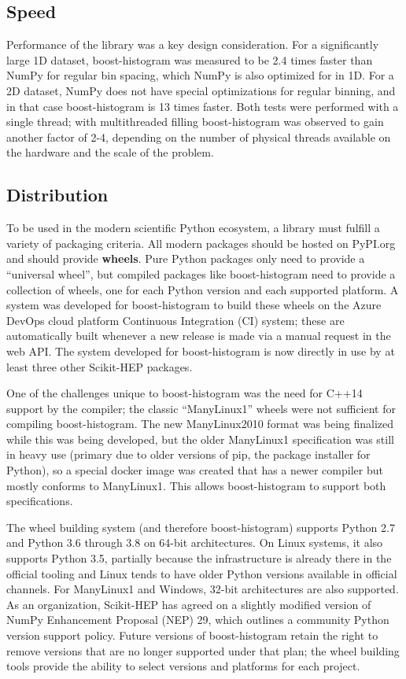 \documentclass{webofc}
\begin{document}
\subsection{Speed}

Performance of the library was a key design consideration. For a significantly large 1D dataset, boost-histogram was measured to be 2.4 times faster than NumPy for regular bin spacing, which NumPy is also optimized for in 1D. For a 2D dataset, NumPy does not have special optimizations for regular binning, and in that case boost-histogram is 13 times faster. Both tests were performed with a single thread; with multithreaded filling boost-histogram was observed to gain another factor of 2-4, depending on the number of physical threads available on the hardware and the scale of the problem.

\subsection{Distribution}

To be used in the modern scientific Python ecosystem, a library must fulfill a variety of packaging criteria. All modern packages should be hosted on PyPI.org and should provide \textbf{wheels}. Pure Python packages only need to provide a ``universal wheel'', but compiled packages like boost-histogram need to provide a collection of wheels, one for each Python version and each supported platform. A system was developed for boost-histogram to build these wheels on the Azure DevOps cloud platform Continuous Integration (CI) system; these are automatically built whenever a new release is made via a manual request in the web API. The system developed for boost-histogram is now directly in use by at least three other Scikit-HEP packages.

One of the challenges unique to boost-histogram was the need for C++14 support by the compiler; the classic ``ManyLinux1'' wheels were not sufficient for compiling boost-histogram. The new ManyLinux2010 format was being finalized while this was being developed, but the older ManyLinux1 specification was still in heavy use 
(primary due to older versions of pip, the package installer for Python), so a special docker image was created that has a newer compiler but mostly conforms to ManyLinux1. This allows boost-histogram to support both specifications.

The wheel building system (and therefore boost-histogram) supports Python 2.7 and Python 3.6 through 3.8 on 64-bit architectures. On Linux systems, it also supports Python 3.5, partially because the infrastructure is already there in the official tooling and Linux tends to have older Python versions available in official channels. For ManyLinux1 and Windows, 32-bit architectures are also supported. As an organization, Scikit-HEP has agreed on a slightly modified version of NumPy Enhancement Proposal (NEP) 29, which outlines a community Python version support policy. Future versions of boost-histogram retain the right to remove versions that are no longer supported under that plan; the wheel building tools provide the ability to select versions and platforms for each project.
\end{document}
